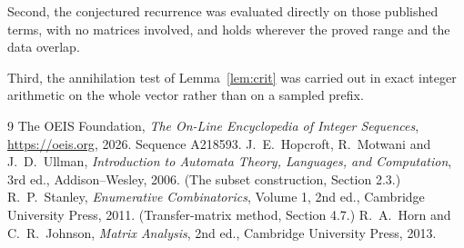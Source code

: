 \documentclass[11pt,a4paper]{article}
\theoremstyle{plain}
\theoremstyle{definition}
\begin{document}
Second, the conjectured recurrence was evaluated directly on those published terms, with no
matrices involved, and holds wherever the proved range and the data overlap.

Third, the annihilation test of Lemma~\ref{lem:crit} was carried out in exact integer
arithmetic on the whole vector rather than on a sampled prefix.

\begin{thebibliography}{9}
 The OEIS Foundation, \emph{The On-Line Encyclopedia of Integer
Sequences}, \url{https://oeis.org}, 2026. Sequence A218593.
 J.~E.~Hopcroft, R.~Motwani and J.~D.~Ullman, \emph{Introduction to Automata
Theory, Languages, and Computation}, 3rd ed., Addison--Wesley, 2006. (The subset
construction, Section 2.3.)
 R.~P.~Stanley, \emph{Enumerative Combinatorics}, Volume 1, 2nd ed.,
Cambridge University Press, 2011. (Transfer-matrix method, Section 4.7.)
 R.~A.~Horn and C.~R.~Johnson, \emph{Matrix Analysis}, 2nd ed., Cambridge
University Press, 2013.
\end{thebibliography}
\end{document}
